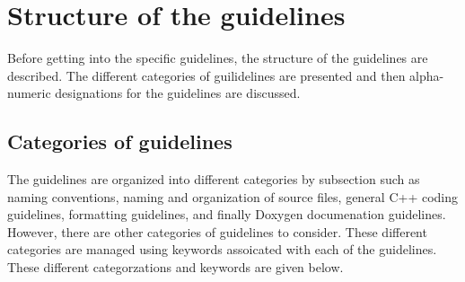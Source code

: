 %
\section{Structure of the guidelines}
\label{sec:guideline_structure}
%

Before getting into the specific guidelines, the structure of the
guidelines are described.  The different categories of guilidelines
are presented and then alpha-numeric designations for the guidelines
are discussed.


%
\subsection{Categories of guidelines}
%

The guidelines are organized into different categories by subsection
such as naming conventions, naming and organization of source files,
general C++ coding guidelines, formatting guidelines, and finally
Doxygen documenation guidelines.  However, there are other categories
of guidelines to consider.  These different categories are managed
using keywords assoicated with each of the guidelines.  These
different categorzations and keywords are given below.

